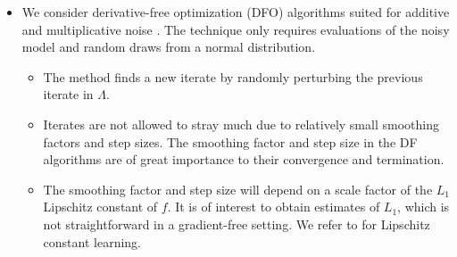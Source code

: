 \documentclass[11pt]{beamer}
\begin{document}
\begin{frame}

\begin{itemize}
 


\item We consider derivative-free optimization (DFO) algorithms suited for additive and multiplicative noise \footnotemark[1]. The technique only requires evaluations of the noisy model and random draws from a normal distribution.


\begin{itemize}


\item The method finds a new iterate by randomly perturbing the previous iterate in $\Lambda$.

\item Iterates are not allowed to stray much due to relatively small smoothing factors and step sizes. The smoothing factor and step size in the DF algorithms are of great importance to their convergence and termination. 

\item The smoothing factor and step size will depend on a scale factor of the $L_1$ Lipschitz constant of $f$. It is of interest to obtain estimates of $L_1$, which is not straightforward in a gradient-free setting. We refer to \footnotemark[2] \footnotemark[3] for Lipschitz constant learning.


\end{itemize}

\end{itemize}


\end{frame}
\end{document}
